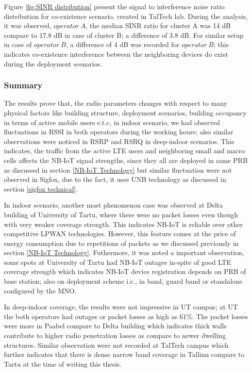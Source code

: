 \documentclass[12pt]{article}
\begin{document}
Figure \ref{fig:SINR distribution} present the signal to interference noise ratio distribution for co-existence scenario, created in TalTech lab. During the analysis, it was observed, $operator\ A$, the median SINR ratio for cluster A was 14 dB compare to 17.8 dB in case of cluster B; a difference of 3.8 dB. For similar setup in case of $operator\ B$, a difference of 4 dB was recorded for $operator\ B$; this indicates co-existence interference between the neighboring devices do exist during the deployment scenarios.

\subsubsection{Summary}


 The results prove that, the radio parameters changes with respect to many physical factors like building structure, deployment scenarios, building occupancy in terms of active mobile users e.t.c, in indoor scenario, we had observed fluctuations in RSSI in both operators during the working hours; also similar observations were noticed in RSRP and RSRQ in deep-indoor scenarios. This indicates, the traffic from the active LTE users and neighboring small and macro cells affects the NB-IoT signal strengths, since they all are deployed in same PRB as discussed in section \ref{NB-IoT Technology} but similar fluctuation were not observed in Sigfox, due to the fact, it uses UNB technology  as discussed in section \ref{sigfox technical}.\par

In indoor scenario, another most phenomenon case was observed at Delta building of University of Tartu, where there were no packet losses even though with very weaker coverage strength. This indicates NB-IoT is reliable over other competitive LPWAN technologies. However, this feature comes at the price of energy consumption due to repetitions of packets as we discussed previously in section \ref{NB-IoT Technology}. Futhermore, it was noted a important observation, some spots at University of Tartu had NB-IoT outages in-spite of good LTE coverage strength which indicates NB-IoT device registration depends on PRB of base station; also on deployment scheme i.e., in band, guard band or standalone configured by the MNO. \par

In deep-indoor coverage, the results were not impressive in UT campus; at UT the both operators had outages or packet losses as high as 61\%. The packet losses were more in Paabel compare to Delta building which indicates thick walls contribute to higher radio penetration losses as compare to newer dwelling structures. Similar observation were not recorded at TalTech campus which further indicates that there is dense narrow band coverage in Tallinn compare to Tartu at the time of writing this thesis.\par
\end{document}
